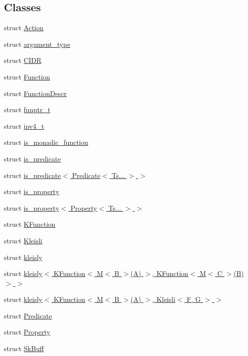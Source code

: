 \subsection*{Classes}
\begin{DoxyCompactItemize}
\item 
struct \hyperlink{structpfq_1_1lang_1_1Action}{Action}
\item 
struct \hyperlink{structpfq_1_1lang_1_1argument__type}{argument\+\_\+type}
\item 
struct \hyperlink{structpfq_1_1lang_1_1CIDR}{C\+I\+DR}
\item 
struct \hyperlink{structpfq_1_1lang_1_1Function}{Function}
\item 
struct \hyperlink{structpfq_1_1lang_1_1FunctionDescr}{Function\+Descr}
\item 
struct \hyperlink{structpfq_1_1lang_1_1funptr__t}{funptr\+\_\+t}
\item 
struct \hyperlink{structpfq_1_1lang_1_1ipv4__t}{ipv4\+\_\+t}
\item 
struct \hyperlink{structpfq_1_1lang_1_1is__monadic__function}{is\+\_\+monadic\+\_\+function}
\item 
struct \hyperlink{structpfq_1_1lang_1_1is__predicate}{is\+\_\+predicate}
\item 
struct \hyperlink{structpfq_1_1lang_1_1is__predicate_3_01Predicate_3_01Ts_8_8_8_01_4_01_4}{is\+\_\+predicate$<$ Predicate$<$ Ts... $>$ $>$}
\item 
struct \hyperlink{structpfq_1_1lang_1_1is__property}{is\+\_\+property}
\item 
struct \hyperlink{structpfq_1_1lang_1_1is__property_3_01Property_3_01Ts_8_8_8_01_4_01_4}{is\+\_\+property$<$ Property$<$ Ts... $>$ $>$}
\item 
struct \hyperlink{structpfq_1_1lang_1_1KFunction}{K\+Function}
\item 
struct \hyperlink{structpfq_1_1lang_1_1Kleisli}{Kleisli}
\item 
struct \hyperlink{structpfq_1_1lang_1_1kleisly}{kleisly}
\item 
struct \hyperlink{structpfq_1_1lang_1_1kleisly_3_01KFunction_3_01M_3_01B_01_4_07A_08_01_4_00_01KFunction_3_01M_3_01C_01_4_07B_08_4_01_4}{kleisly$<$ K\+Function$<$ M$<$ B $>$(\+A) $>$, K\+Function$<$ M$<$ C $>$(\+B)$>$ $>$}
\item 
struct \hyperlink{structpfq_1_1lang_1_1kleisly_3_01KFunction_3_01M_3_01B_01_4_07A_08_01_4_00_01Kleisli_3_01F_00_01G_01_4_01_4}{kleisly$<$ K\+Function$<$ M$<$ B $>$(\+A) $>$, Kleisli$<$ F, G $>$ $>$}
\item 
struct \hyperlink{structpfq_1_1lang_1_1Predicate}{Predicate}
\item 
struct \hyperlink{structpfq_1_1lang_1_1Property}{Property}
\item 
struct \hyperlink{structpfq_1_1lang_1_1SkBuff}{Sk\+Buff}
\end{DoxyCompactItemize}
